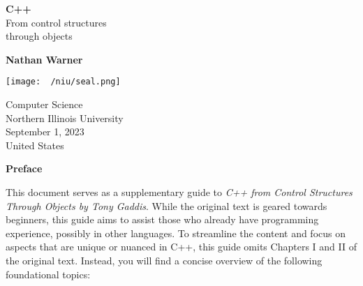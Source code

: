 \documentclass{report}
\title{\Huge{}}
\author{\huge{Nathan Warner}}
\date{\huge{}}
\begin{document}
        \begin{titlepage}
       \begin{center}
           \vspace*{1cm}
    
           \textbf{C++} \\
           From control structures  \\ through objects
    
           \vspace{0.5cm}
            
                
           \vspace{1.5cm}
    
           \textbf{Nathan Warner}
    
           \vfill
                
                
           \vspace{0.8cm}
         
           \texttt{[image: ~/niu/seal.png]}
                
           Computer Science \\
           Northern Illinois University\\
           September 1, 2023 \\
           United States\\
           
                
       \end{center}
    \end{titlepage}
    \tableofcontents
    \pagebreak \bigbreak \noindent
    \begin{center}
        \begin{Huge}
           \textbf{Preface} 
        \end{Huge}
    \end{center}
    \bigbreak \noindent 
    \sepline
    \bigbreak \noindent 
    This document serves as a supplementary guide to \textit{C++ from Control Structures Through Objects by Tony Gaddis}. While the original text is geared towards beginners, this guide aims to assist those who already have programming experience, possibly in other languages.
    \bigbreak \noindent 
    To streamline the content and focus on aspects that are unique or nuanced in C++, this guide omits Chapters I and II of the original text. Instead, you will find a concise overview of the following foundational topics:
\end{document}
